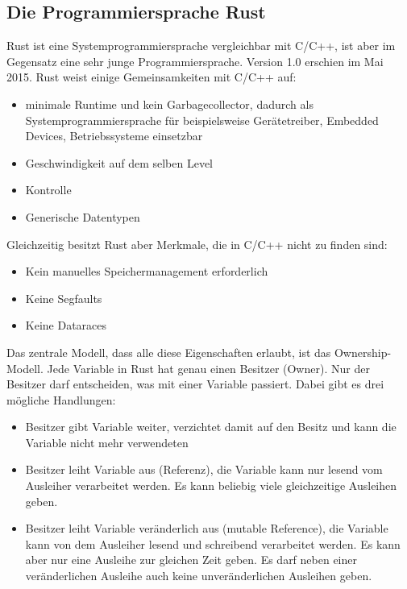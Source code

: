 \subsection{Die Programmiersprache Rust}
\label{sub:rust_sprache}
Rust ist eine Systemprogrammiersprache vergleichbar mit C/C++, ist aber im
Gegensatz eine sehr junge Programmiersprache. Version 1.0 erschien im Mai
2015. Rust weist einige Gemeinsamkeiten mit C/C++ auf:
\begin{itemize}
	\item minimale Runtime und kein Garbagecollector, dadurch als
	      Systemprogrammiersprache für beispielsweise Gerätetreiber, Embedded
	      Devices, Betriebssysteme einsetzbar
	\item Geschwindigkeit auf dem selben Level
	\item Kontrolle
	\item Generische Datentypen
\end{itemize}

Gleichzeitig besitzt Rust aber Merkmale, die in C/C++ nicht zu finden sind:
\begin{itemize}
	\item Kein manuelles Speichermanagement erforderlich
	\item Keine Segfaults
	\item Keine Dataraces
\end{itemize}

Das zentrale Modell, dass alle diese Eigenschaften erlaubt, ist das
Ownership-Modell\cite{ownership}. Jede Variable in Rust hat genau einen
Besitzer (Owner). Nur der Besitzer darf entscheiden, was mit einer Variable
passiert. Dabei gibt es drei mögliche Handlungen:
\begin{itemize}
	\item Besitzer gibt Variable weiter, verzichtet damit auf den Besitz und
	      kann die Variable nicht mehr verwendeten
	\item Besitzer leiht Variable aus (Referenz), die Variable kann nur
	      lesend vom Ausleiher verarbeitet werden. Es kann beliebig viele
	      gleichzeitige Ausleihen geben.
	\item Besitzer leiht Variable veränderlich aus (mutable Reference), die
	      Variable kann von dem Ausleiher lesend und schreibend verarbeitet werden.
	      Es kann aber nur eine Ausleihe zur gleichen Zeit geben. Es darf neben
	      einer veränderlichen Ausleihe auch keine unveränderlichen Ausleihen
	      geben.
\end{itemize}

